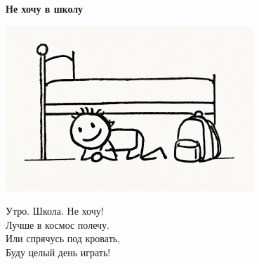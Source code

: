 \vspace*{\fill}
\begin{center}
  {\huge\textbf{Не хочу в школу}}

  \vspace{1.5em}
  \includegraphics[width=0.7\textwidth]{pictures/school.png}
  \vspace{4em}
  \parbox{0.6\textwidth}{
    \LARGE
    \begin{spacing}{1.2}
      Утро. Школа. Не хочу!\\
      Лучше в космос полечу.\\
      Или спрячусь под кровать,\\
      Буду целый день играть! %
    \end{spacing}
      
  }
\end{center}
\vspace*{\fill}